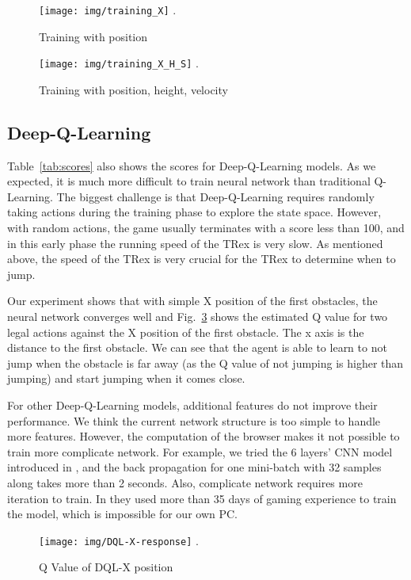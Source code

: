 \documentclass[conference]{IEEEtran}
\begin{document}
\begin{figure}[ht]
\centering
\texttt{[image: img/training\_X]}
\DeclareGraphicsExtensions.
\caption{Training with position}
\label{fig:training_X}
\end{figure}

\begin{figure}[ht]
\centering
\texttt{[image: img/training\_X\_H\_S]}
\DeclareGraphicsExtensions.
\caption{Training with position, height, velocity}
\label{fig:training_X_H_S}
\end{figure}

\subsection{Deep-Q-Learning}
Table~\ref{tab:scores} also shows the scores for Deep-Q-Learning models. As we expected, it is much more difficult to train neural network than traditional Q-Learning. The biggest challenge is that Deep-Q-Learning requires randomly taking actions during the training phase to explore the state space. However, with random actions, the game usually terminates with a score less than 100, and in this early phase the running speed of the TRex is very slow. As mentioned above, the speed of the TRex is very crucial for the TRex to determine when to jump.

Our experiment shows that with simple X position of the first obstacles, the neural network converges well and Fig.~\ref{fig:dql-x} shows the estimated Q value for two legal actions against the X position of the first obstacle. The x axis is the distance to the first obstacle. We can see that the agent is able to learn to not jump when the obstacle is far away (as the Q value of not jumping is higher than jumping) and start jumping when it comes close. 

For other Deep-Q-Learning models, additional features do not improve their performance. We think the current network structure is too simple to handle more features. However, the computation of the browser makes it not possible to train more complicate network. For example, we tried the 6 layers' CNN model introduced in \cite{mnih2015humanlevel}, and the back propagation for one mini-batch with 32 samples along takes more than 2 seconds. Also, complicate network requires more iteration to train. In \cite{mnih2015humanlevel} they used more than 35 days of gaming experience to train the model, which is impossible for our own PC.

\begin{figure}[ht]
\centering
\texttt{[image: img/DQL-X-response]}
\DeclareGraphicsExtensions.
\caption{Q Value of DQL-X position}
\label{fig:dql-x}
\end{figure}
\end{document}
